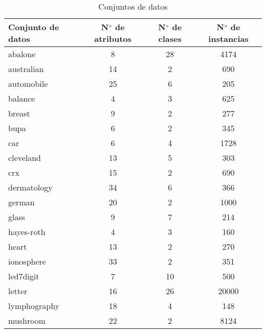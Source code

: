 \begin{table}[]
\centering
\caption{Conjuntos de datos}
\label{tab:DS}
\begin{tabular}{@{}lccc@{}}
\toprule
Conjunto de datos & N$\degree$ de atributos & N$\degree$ de clases & N$\degree$ de instancias \\ \midrule
abalone           & 8                   & 28               & 4174                 \\
australian        & 14                  & 2                & 690                  \\
automobile        & 25                  & 6                & 205                  \\
balance           & 4                   & 3                & 625                  \\
breast            & 9                   & 2                & 277                  \\
bupa              & 6                   & 2                & 345                  \\
car               & 6                   & 4                & 1728                 \\
cleveland         & 13                  & 5                & 303                  \\
crx               & 15                  & 2                & 690                  \\
dermatology       & 34                  & 6                & 366                  \\
german            & 20                  & 2                & 1000                 \\
glass             & 9                   & 7                & 214                  \\
hayes-roth        & 4                   & 3                & 160                  \\
heart             & 13                  & 2                & 270                  \\
ionosphere        & 33                  & 2                & 351                  \\
led7digit         & 7                   & 10               & 500                  \\
letter            & 16                  & 26               & 20000                \\
lymphography      & 18                  & 4                & 148                  \\
mushroom          & 22                  & 2                & 8124                 \\

\end{tabular}
\end{table}
